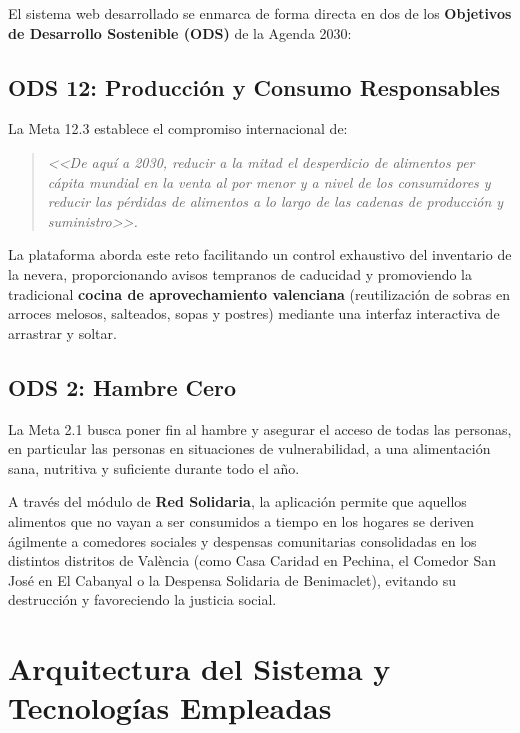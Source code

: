 \documentclass[11pt,a4paper]{article}
\begin{document}
El sistema web desarrollado se enmarca de forma directa en dos de los \textbf{Objetivos de Desarrollo Sostenible (ODS)} de la Agenda 2030:

\subsection{ODS 12: Producción y Consumo Responsables}
La Meta 12.3 establece el compromiso internacional de:
\begin{quote}
\textit{<<De aquí a 2030, reducir a la mitad el desperdicio de alimentos per cápita mundial en la venta al por menor y a nivel de los consumidores y reducir las pérdidas de alimentos a lo largo de las cadenas de producción y suministro>>.}
\end{quote}
La plataforma aborda este reto facilitando un control exhaustivo del inventario de la nevera, proporcionando avisos tempranos de caducidad y promoviendo la tradicional \textbf{cocina de aprovechamiento valenciana} (reutilización de sobras en arroces melosos, salteados, sopas y postres) mediante una interfaz interactiva de arrastrar y soltar.

\subsection{ODS 2: Hambre Cero}
La Meta 2.1 busca poner fin al hambre y asegurar el acceso de todas las personas, en particular las personas en situaciones de vulnerabilidad, a una alimentación sana, nutritiva y suficiente durante todo el año.

A través del módulo de \textbf{Red Solidaria}, la aplicación permite que aquellos alimentos que no vayan a ser consumidos a tiempo en los hogares se deriven ágilmente a comedores sociales y despensas comunitarias consolidadas en los distintos distritos de València (como Casa Caridad en Pechina, el Comedor San José en El Cabanyal o la Despensa Solidaria de Benimaclet), evitando su destrucción y favoreciendo la justicia social.

\newpage

\section{Arquitectura del Sistema y Tecnologías Empleadas}
\end{document}

